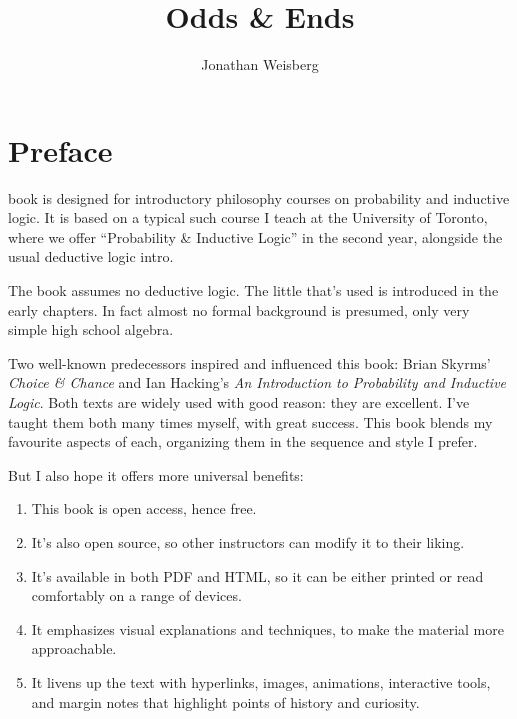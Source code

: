\documentclass[justified]{tufte-book}
\title{Odds \& Ends}
\author{Jonathan Weisberg}
\date{}
\providecommand{\tightlist}{%
  \setlength{\itemsep}{0pt}\setlength{\parskip}{0pt}}
\theoremstyle{definition}
\theoremstyle{definition}
\theoremstyle{definition}
\theoremstyle{remark}
\begin{document}
\maketitle



{
\setcounter{tocdepth}{1}
\tableofcontents
}

\hypertarget{preface}{%
\chapter*{Preface}\label{preface}}

 book is designed for introductory philosophy courses
on probability and inductive logic. It is based on a typical such course
I teach at the University of Toronto, where we offer ``Probability \&
Inductive Logic'' in the second year, alongside the usual deductive
logic intro.\(\,\)

The book assumes no deductive logic. The little that's used is
introduced in the early chapters. In fact almost no formal background is
presumed, only very simple high school algebra.

Two well-known predecessors inspired and influenced this book: Brian
Skyrms' \emph{Choice \& Chance} and Ian Hacking's \emph{An Introduction
to Probability and Inductive Logic}. Both texts are widely used with
good reason: they are excellent. I've taught them both many times
myself, with great success. This book blends my favourite aspects of
each, organizing them in the sequence and style I prefer.

But I also hope it offers more universal benefits:

\begin{enumerate}
\def\labelenumi{\arabic{enumi}.}
\tightlist
\item
  This book is open access, hence free.
\item
  It's also open source, so other instructors can modify it to their
  liking.
\item
  It's available in both PDF and HTML, so it can be either printed or
  read comfortably on a range of devices.
\item
  It emphasizes visual explanations and techniques, to make the material
  more approachable.
\item
  It livens up the text with hyperlinks, images, animations, interactive
  tools, and margin notes that highlight points of history and
  curiosity.
\end{enumerate}
\end{document}
